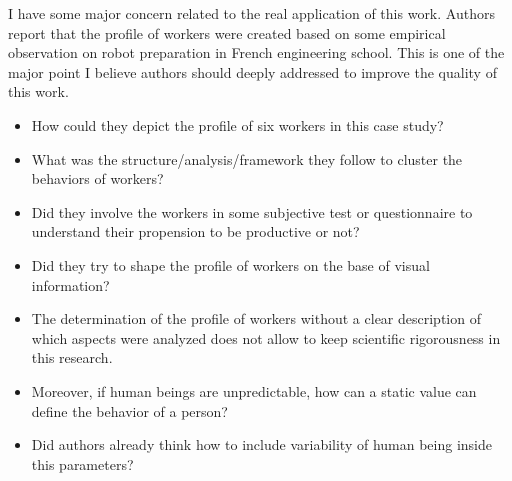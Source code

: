 \documentclass[preprint,11pt,3p]{elsarticle}
\begin{document}
\begin{tcolorbox}[colback=q_color1,colframe=q_color2,title=Q13  :]	
    I have some major concern related to the real application of this work. Authors report that the profile of workers were created based on some empirical observation on robot preparation in French engineering school. This is one of the major point I believe authors should deeply addressed to improve the quality of this work.
    \begin{itemize}
        \item How could they depict the profile of six workers in this case study?
        \item What was the structure/analysis/framework they follow to cluster the behaviors of workers? 
        \item Did they involve the workers in some subjective test or questionnaire to understand their propension to be productive or not?
        \item Did they try to shape the profile of workers on the base of visual information? 
        \item The determination of the profile of workers without a clear description of which aspects were analyzed does not allow to keep scientific rigorousness in this research. 
        \item Moreover, if human beings are unpredictable, how can a static value can define the behavior of a person?
        \item Did authors already think how to include variability of human being inside this parameters?
    \end{itemize}
       
\end{tcolorbox}
\end{document}
